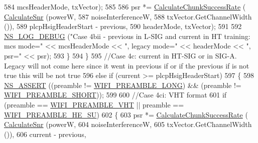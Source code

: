 \begin{DoxyCode}
584                                                     mcsHeaderMode, txVector);
585 
586                   psr *= \hyperlink{classns3_1_1InterferenceHelper_ab1c34c3f7ecef1e37ec778c0cf0e9cef}{CalculateChunkSuccessRate} (
      \hyperlink{classns3_1_1InterferenceHelper_a8f6192d041874595004c007c5a519b4b}{CalculateSnr} (powerW,
587                                                                   noiseInterferenceW,
588                                                                   txVector.GetChannelWidth ()),
589                                                     plcpHsigHeaderStart - previous,
590                                                     headerMode, txVector);
591 
592                   \hyperlink{group__logging_ga413f1886406d49f59a6a0a89b77b4d0a}{NS\_LOG\_DEBUG} (\textcolor{stringliteral}{"Case 4bii - previous in L-SIG and current in HT training: mcs
       mode="} << mcsHeaderMode << \textcolor{stringliteral}{", legacy mode="} << headerMode << \textcolor{stringliteral}{", psr="} << psr);
593                 \}
594             \}
595           \textcolor{comment}{//Case 4c: current in HT-SIG or in SIG-A. Legacy will not come here since it went in previous if
       or if the previous if is not true this will be not true}
596           \textcolor{keywordflow}{else} \textcolor{keywordflow}{if} (current >= plcpHsigHeaderStart)
597             \{
598               \hyperlink{assert_8h_a6dccdb0de9b252f60088ce281c49d052}{NS\_ASSERT} ((preamble != \hyperlink{group__wifi_gga5e94a56cb338a14ffbbb19c6a41251eba12f3d9468d1630bd38bbef20df1e3eda}{WIFI\_PREAMBLE\_LONG}) && (preamble != 
      \hyperlink{group__wifi_gga5e94a56cb338a14ffbbb19c6a41251ebab9a39ca1f62d36c33ac489c4cf59745b}{WIFI\_PREAMBLE\_SHORT}));
599 
600               \textcolor{comment}{//Case 4ci: VHT format}
601               \textcolor{keywordflow}{if} (preamble == \hyperlink{group__wifi_gga5e94a56cb338a14ffbbb19c6a41251ebab90b0fe0b17f27e51c0fe16239e7b089}{WIFI\_PREAMBLE\_VHT} || preamble == 
      \hyperlink{group__wifi_gga5e94a56cb338a14ffbbb19c6a41251eba99c3e12c6e91fc9a9bee491d20dab807}{WIFI\_PREAMBLE\_HE\_SU})
602                 \{
603                   psr *= \hyperlink{classns3_1_1InterferenceHelper_ab1c34c3f7ecef1e37ec778c0cf0e9cef}{CalculateChunkSuccessRate} (
      \hyperlink{classns3_1_1InterferenceHelper_a8f6192d041874595004c007c5a519b4b}{CalculateSnr} (powerW,
604                                                                   noiseInterferenceW,
605                                                                   txVector.GetChannelWidth ()),
606                                                     current - previous,

\end{DoxyCode}
